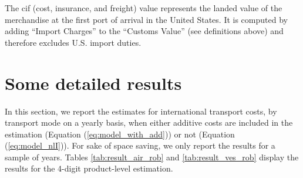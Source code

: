 \documentclass[a4paper,11pt]{article}
\begin{document}
The cif (cost, insurance, and freight) value represents the landed value of the merchandise at the first port of arrival in the United States. It is computed by adding ``Import Charges'' to the ``Customs Value'' (see definitions above) and therefore excludes U.S. import duties.

\section{Some detailed results \label{app:more_results}}

In this section, we report the estimates for international transport costs, by transport mode on a yearly basis, when either additive costs are included in the estimation (Equation (\ref{eq:model_with_add})) or not (Equation (\ref{eq:model_nlI})). For sake of space saving, we only report the results for a sample of years. Tables \ref{tab:result_air_rob} and \ref{tab:result_ves_rob} display the results for the 4-digit product-level estimation.
\end{document}
